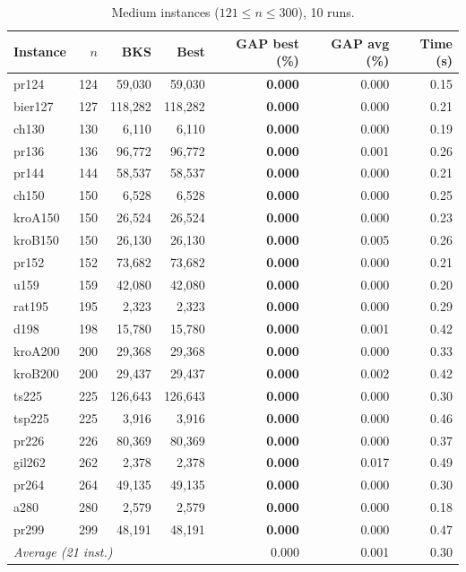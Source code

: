 \documentclass[runningheads]{llncs}
\begin{document}
\begin{table}
\caption{Medium instances ($121\le n\le 300$), 10 runs.}
\label{tab:medium}
\centering\scriptsize
\begin{tabular}{@{}lrrrrrr@{}}
\toprule
\textbf{Instance} & $n$ & \textbf{BKS} & \textbf{Best} & \textbf{GAP best (\%)} & \textbf{GAP avg (\%)} & \textbf{Time (s)}\\
\midrule
pr124 & 124 & 59{,}030 & 59{,}030 & \textbf{0.000} & 0.000 & 0.15 \\
bier127 & 127 & 118{,}282 & 118{,}282 & \textbf{0.000} & 0.000 & 0.21 \\
ch130 & 130 & 6{,}110 & 6{,}110 & \textbf{0.000} & 0.000 & 0.19 \\
pr136 & 136 & 96{,}772 & 96{,}772 & \textbf{0.000} & 0.001 & 0.26 \\
pr144 & 144 & 58{,}537 & 58{,}537 & \textbf{0.000} & 0.000 & 0.21 \\
ch150 & 150 & 6{,}528 & 6{,}528 & \textbf{0.000} & 0.000 & 0.25 \\
kroA150 & 150 & 26{,}524 & 26{,}524 & \textbf{0.000} & 0.000 & 0.23 \\
kroB150 & 150 & 26{,}130 & 26{,}130 & \textbf{0.000} & 0.005 & 0.26 \\
pr152 & 152 & 73{,}682 & 73{,}682 & \textbf{0.000} & 0.000 & 0.21 \\
u159 & 159 & 42{,}080 & 42{,}080 & \textbf{0.000} & 0.000 & 0.20 \\
rat195 & 195 & 2{,}323 & 2{,}323 & \textbf{0.000} & 0.000 & 0.29 \\
d198 & 198 & 15{,}780 & 15{,}780 & \textbf{0.000} & 0.001 & 0.42 \\
kroA200 & 200 & 29{,}368 & 29{,}368 & \textbf{0.000} & 0.000 & 0.33 \\
kroB200 & 200 & 29{,}437 & 29{,}437 & \textbf{0.000} & 0.002 & 0.42 \\
ts225 & 225 & 126{,}643 & 126{,}643 & \textbf{0.000} & 0.000 & 0.30 \\
tsp225 & 225 & 3{,}916 & 3{,}916 & \textbf{0.000} & 0.000 & 0.46 \\
pr226 & 226 & 80{,}369 & 80{,}369 & \textbf{0.000} & 0.000 & 0.37 \\
gil262 & 262 & 2{,}378 & 2{,}378 & \textbf{0.000} & 0.017 & 0.49 \\
pr264 & 264 & 49{,}135 & 49{,}135 & \textbf{0.000} & 0.000 & 0.30 \\
a280 & 280 & 2{,}579 & 2{,}579 & \textbf{0.000} & 0.000 & 0.18 \\
pr299 & 299 & 48{,}191 & 48{,}191 & \textbf{0.000} & 0.000 & 0.47 \\
\midrule
\multicolumn{4}{l}{\textit{Average (21 inst.)}} & 0.000 & 0.001 & 0.30 \\
\bottomrule
\end{tabular}
\end{table}
\end{document}
